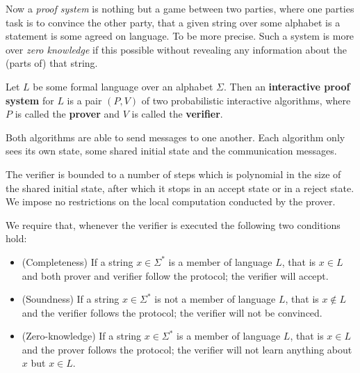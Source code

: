 Now a \textit{proof system} is nothing but a game between two parties, where one parties task is to convince the other party, that a given string over some alphabet is a statement is some agreed on language. To be more precise. Such a system is more over \textit{zero knowledge} if this possible without revealing any information about the (parts of) that string.
\begin{definition}
Let $L$ be some formal language over an alphabet $\Sigma$. Then an \textbf{interactive proof system} for $L$ is a pair $(P,V)$ of two probabilistic interactive algorithms, where $P$ is called the \textbf{prover} and $V$ is called the \textbf{verifier}. 

Both algorithms are able to send messages to one another. Each algorithm only sees its own state, some shared initial state and the communication messages. 

The verifier is bounded to a number of steps which is polynomial in the size of the shared initial state, after which it stops in an accept state or in a reject state. We impose no restrictions on the local computation conducted by the prover. 

We require that, whenever the verifier is executed the following two conditions hold:
\begin{itemize}
\item (Completeness) If a string $x\in \Sigma^*$ is a member of language $L$, that is $x\in L$ and both prover and verifier follow the protocol; the verifier will accept.
\item (Soundness) If a string $x\in \Sigma^*$ is not a member of language $L$, that is $x\notin L$ and the verifier follows the protocol; the verifier will not be convinced.
\item (Zero-knowledge) If a string $x\in \Sigma^*$ is a member of language $L$, that is $x\in L$ and the prover follows the protocol; the verifier will not learn anything about $x$ but $x\in L$.
\end{itemize}
\end{definition}

